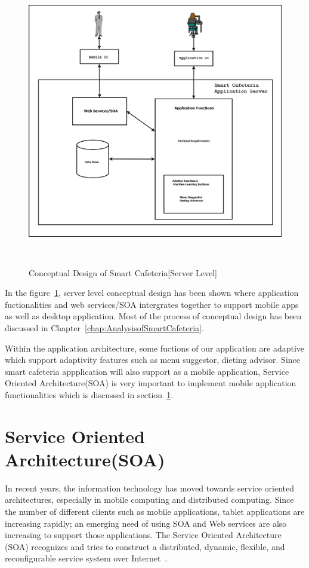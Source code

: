 \begin{figure}[h!t]
    \centering
      \includegraphics[width=5.5in,height=5in]{ch4/SOA/ConceptualArchitecture_new}
  \caption{Conceptual Design of Smart Cafeteria[Server Level]}
  \label{ConceptualArchitecture_server_level}
\end{figure}
In the figure~\ref{ConceptualArchitecture_server_level}, server level
conceptual design has been shown where application fuctionalities and
web services/SOA intergrates together to support mobile apps as well as desktop
application. Most of the process of conceptual design has been discussed in
Chapter~\ref{chap:AnalysisofSmartCafeteria}.

Within the application architecture, some fuctions of our application are
adaptive which support adaptivity features such as menu suggestor, dieting
advisor. Since smart cafeteria appplication will also support as a mobile
application, Service Oriented Architecture(SOA) is very important to implement
mobile application functionalities which is discussed in section~\ref{sec:SOA}.


\section{Service Oriented Architecture(SOA)}
\label{sec:SOA}
In recent years, the information technology has moved towards service oriented
architectures, especially in mobile computing and distributed computing. Since
the number of different clients such as mobile applications, tablet applications
are increasing rapidly; an emerging need of using SOA and Web services are also
increasing to support those applications. The Service Oriented Architecture
(SOA) recognizes and tries to construct a distributed, dynamic, flexible, and
reconfigurable service system over Internet~\cite{Aydin2007}.


